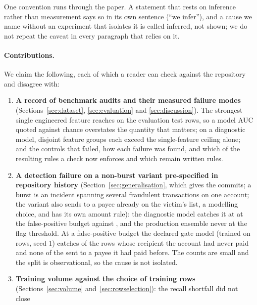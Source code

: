 One convention runs through the paper. A statement that rests on inference rather than measurement
says so in its own sentence (``we infer''), and a cause we name without an experiment that isolates
it is called inferred, not shown; we do not repeat the caveat in every paragraph that relies on it.

\paragraph{Contributions.} We claim the following, each of which a reader can check against the
repository and disagree with:
\begin{enumerate}
  \item \textbf{A record of benchmark audits and their measured failure modes}
        (Sections~\ref{sec:dataset}, \ref{sec:evaluation} and \ref{sec:discussion}). The strongest
        single engineered feature reaches \nGateFloor{} on the evaluation test rows, so a model AUC
        quoted against chance overstates the quantity that matters; on a diagnostic
        model, \nGroupsAboveCeiling{} disjoint feature groups each exceed the \nCeiling{}
        single-feature ceiling alone; and the controls
        that failed, how each failure was found, and which of the resulting rules a check now
        enforces and which remain written rules.
  \item \textbf{A detection failure on a non-burst variant pre-specified in repository history}
        (Section~\ref{sec:generalisation}, which gives the commits; a burst is an incident spanning
        several fraudulent transactions on one account; the variant also sends to a payee already on the
        victim's list, a modelling choice, and has its own amount rule): the diagnostic model catches it
        at \nRevRecall{} \nRevCI{} at the \nFPRBudget{} false-positive budget against \nBaseVarRecall{} \nBaseVarCI{}, and the production
        ensemble never at the flag threshold. At a \nFPRBudget{} false-positive budget the declared gate model (trained on \nTrainUsed{} rows, seed 1) catches
        \nGateRevNewBudgetCaught{} of the \nGateRevNewBudgetRows{} rows whose recipient the
        account had never paid and none of the \nGateRevKnownBudgetRows{} sent to a payee it had paid before.
        The counts are small and the split is observational, so the cause is not isolated.
  \item \textbf{Training volume against the choice of training rows}
        (Sections~\ref{sec:volume} and~\ref{sec:rowselection}): the recall shortfall did not close

\end{enumerate}
